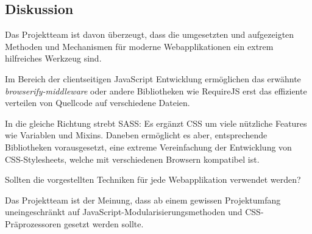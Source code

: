 \subsection*{Diskussion}
Das Projektteam ist davon überzeugt, dass die umgesetzten und aufgezeigten Methoden und Mechanismen für moderne Webapplikationen ein extrem hilfreiches Werkzeug sind.

Im Bereich der clientseitigen JavaScript Entwicklung ermöglichen das erwähnte \emph{browserify-middleware} oder andere Bibliotheken wie RequireJS \cite{requirejs} erst das effiziente verteilen von Quellcode auf verschiedene Dateien.

In die gleiche Richtung strebt SASS: Es ergänzt CSS um viele nützliche Features wie Variablen und Mixins. Daneben ermöglicht es aber, entsprechende Bibliotheken vorausgesetzt, eine extreme Vereinfachung der Entwicklung von CSS-Stylesheets, welche mit verschiedenen Browsern kompatibel ist.

Sollten die vorgestellten Techniken für jede Webapplikation verwendet werden?

Das Projektteam ist der Meinung, dass ab einem gewissen Projektumfang uneingeschränkt auf JavaScript-Modularisierungsmethoden und CSS-Präprozessoren gesetzt werden sollte.